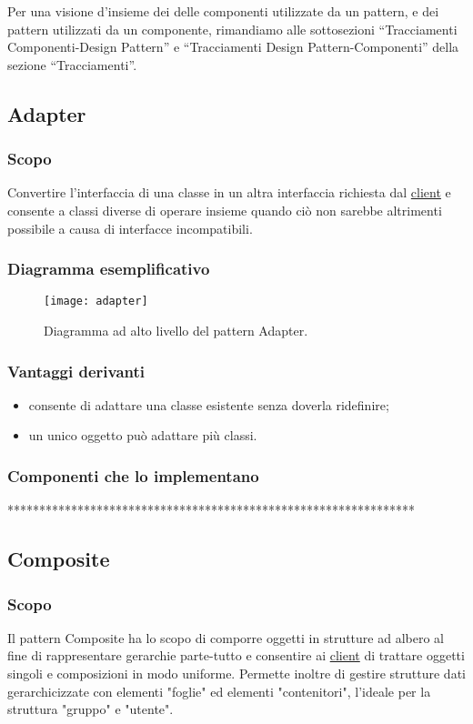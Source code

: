 Per una visione d'insieme dei delle componenti utilizzate da un pattern, e dei pattern utilizzati da un componente, rimandiamo alle sottosezioni ``Tracciamenti Componenti-Design Pattern'' e ``Tracciamenti Design Pattern-Componenti'' della sezione ``Tracciamenti''.


\subsection{Adapter}
\subsubsection{Scopo}
Convertire l'interfaccia di una classe in un altra interfaccia richiesta dal \underline{client} e consente a classi diverse di operare insieme quando ciò non sarebbe altrimenti possibile a causa di interfacce incompatibili.
\subsubsection{Diagramma esemplificativo}
\begin{figure}[h]
\centering
\texttt{[image: adapter]}
\caption{Diagramma ad alto livello del pattern Adapter.}\label{fig:adapter}
\end{figure}
\subsubsection{Vantaggi derivanti}
\begin{itemize}
\item consente di adattare una classe esistente senza doverla ridefinire;
\item un unico oggetto può adattare più classi.
\end{itemize}
\subsubsection{Componenti che lo implementano}
\item *****************************************************************

\subsection{Composite}
\subsubsection{Scopo}
Il pattern Composite ha lo scopo di comporre oggetti in strutture ad albero al fine di rappresentare gerarchie parte-tutto e consentire ai \underline{client} di trattare oggetti singoli e composizioni in modo uniforme. Permette inoltre di gestire strutture dati gerarchicizzate con elementi "foglie" ed elementi "contenitori", l'ideale per la struttura "gruppo" e "utente".
